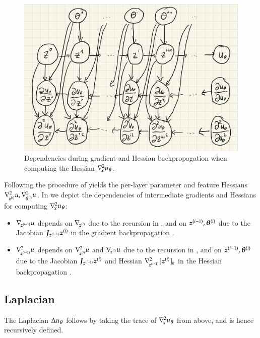 \begin{figure}[t]
  \centering
  \includegraphics[width=0.6\linewidth]{figures/HBP_graph.png}
  \caption{Dependencies during gradient and Hessian backpropagation when computing the Hessian $\nabla_{\!{{\boldsymbol{x}}}}^{2}u_{{\boldsymbol{\theta}}}$.}\label{fig:hbp-dependencies}
  \label{fig:hbp-dependencies}
\end{figure}

Following the procedure of  yields the
per-layer parameter and feature Hessians $\nabla_{\!{{\boldsymbol{z}}^{(i)}}}^{2}u,
\nabla_{\!{{\boldsymbol{\theta}}^{(i)}}}^{2}u$. In  we depict the dependencies of
intermediate gradients and Hessians for computing $\nabla_{\!{{\boldsymbol{x}}}}^{2}u_{{\boldsymbol{\theta}}}$:
\begin{itemize}
\item $\nabla_{\!{{\boldsymbol{z}}^{(i-1)}}}u$ depends on $\nabla_{\!{{\boldsymbol{z}}^{(i)}}}$ due to the recursion in , and on ${\boldsymbol{z}}^{(i-1)}, {\boldsymbol{\theta}}^{(i)}$ due to the Jacobian ${\boldsymbol{J}}_{{\boldsymbol{z}}^{(i-1)}}{\boldsymbol{z}}^{(i)}$ in the gradient backpropagation .

\item $\nabla_{\!{{\boldsymbol{z}}^{(i-1)}}}^{2}u$ depends on $\nabla_{\!{{\boldsymbol{z}}^{(i)}}}^{2}u$ and $\nabla_{\!{{\boldsymbol{z}}^{(i)}}} u$ due to the recursion in , and on ${\boldsymbol{z}}^{(i-1)}, {\boldsymbol{\theta}}^{(i)}$ due to the Jacobian ${\boldsymbol{J}}_{{\boldsymbol{z}}^{(i-1)}}{\boldsymbol{z}}^{(i)}$ and Hessian $\nabla_{\!{{\boldsymbol{z}}^{(i-1)}}}^{2}[{\boldsymbol{z}}^{(i)}]_k$ in the Hessian backpropagation .
\end{itemize}

\subsection{Laplacian}

The Laplacian $\Delta u_{{\boldsymbol{\theta}}}$ follows by taking the trace of
$\nabla_{\!{{\boldsymbol{x}}}}^{2}u_{{\boldsymbol{\theta}}}$ from above, and is hence recursively defined.

